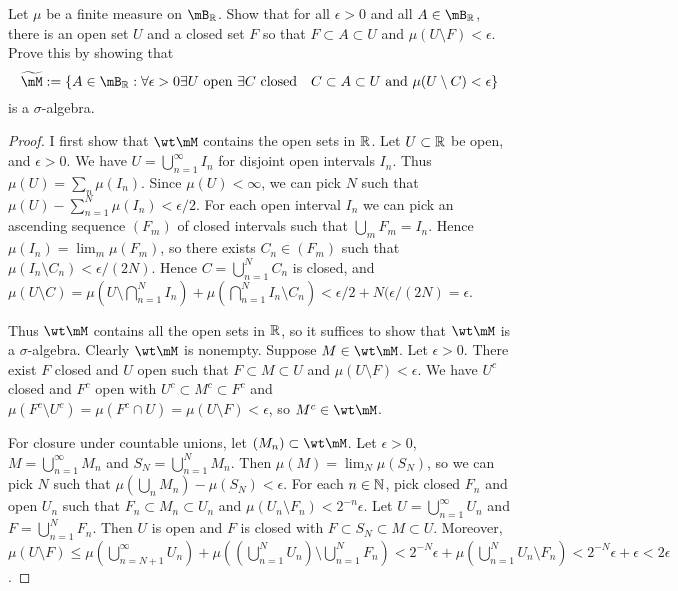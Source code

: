 \documentclass{article}
\begin{document}
 Let $\mu$ be a finite measure on $\mB_\R$. Show that for all $\epsilon > 0$ and all $A \in \mB_\R$, there is an open set $U$ and a closed set $F$ so that $F \subset A \subset U$ and $\mu(U \setminus F) < \epsilon$.  Prove this by showing that 
$$\widetilde \mM := \{ A \in \mB_\R : \forall \epsilon > 0 \exists U \text{ open } \exists C \text{ closed} \quad C \subset A \subset U \text{ and } \mu(U\setminus C) < \epsilon\}$$
is a $\sigma$-algebra.
\begin{proof}
I first show that $\wt \mM$ contains the open sets in $\mathbb{R}$. Let $U \subset \mathbb{R}$ be open, and $\epsilon > 0$.  We have $U = \bigcup_{n=1}^\infty I_n$ for disjoint open intervals $I_n$.  Thus $\mu(U) = \sum_n \mu(I_n)$. Since $\mu(U) < \infty$, we can pick $N$ such that $\mu(U) - \sum_{n=1}^N \mu(I_n) < \epsilon/2$. For each open interval $I_n$ we can pick an ascending sequence $(F_m)$ of closed intervals such that $\bigcup_m F_m = I_n$. Hence $\mu(I_n) = \lim_m \mu(F_m)$, so there exists $C_n \in (F_m)$ such that $\mu(I_n \setminus C_n) < \epsilon/(2N)$.  Hence $C = \bigcup_{n=1}^N C_n$ is closed, and $\mu(U \setminus C) = \mu(U \setminus \bigcap_{n=1}^N I_n) + \mu(\bigcap_{n=1}^N I_n \setminus C_n) < \epsilon/2 + N(\epsilon/(2N) = \epsilon$.

Thus $\wt \mM$ contains all the open sets in $\mathbb{R}$, so it suffices to show that $\wt \mM$ is a $\sigma$-algebra. Clearly $\wt \mM$ is nonempty.  Suppose $M \in \wt \mM$.  Let $\epsilon > 0$. There exist $F$ closed and $U$ open such that $F \subset M \subset U$ and $\mu( U \setminus F) < \epsilon$.  We have $U^c$ closed and $F^c$ open with $U^c \subset M^c \subset F^c$ and $\mu(F^c \setminus U^c) = \mu(F^c \cap U) = \mu(U \setminus F) < \epsilon$, so $M^c \in \wt \mM$.

For closure under countable unions, let $(M_n) \subset \wt \mM$. Let $\epsilon > 0$, $M = \bigcup_{n=1}^\infty M_n$ and $S_N = \bigcup_{n=1}^N M_n$.  Then $\mu(M) = \lim_N \mu(S_N)$, so we can pick $N$ such that $\mu(\bigcup_n M_n) - \mu(S_N) < \epsilon$.  For each $n\in\mathbb{N}$, pick closed $F_n$ and open $U_n$ such that $F_n \subset M_n \subset U_n$ and $\mu(U_n \setminus F_n) < 2^{-n} \epsilon$.  Let $U = \bigcup_{n=1}^\infty U_n$ and $F = \bigcup_{n=1}^N F_n$. Then $U$ is open and $F$ is closed with $F \subset S_N \subset M \subset U$.  Moreover, $\mu(U \setminus F) \le \mu(\bigcup_{n=N+1}^\infty U_n) + \mu((\bigcup_{n=1}^N U_n) \setminus \bigcup_{n=1}^N F_n) < 2^{-N} \epsilon + \mu(\bigcup_{n=1}^N U_n \setminus F_n) < 2^{-N} \epsilon + \epsilon < 2 \epsilon$.
\end{proof}
\end{document}
